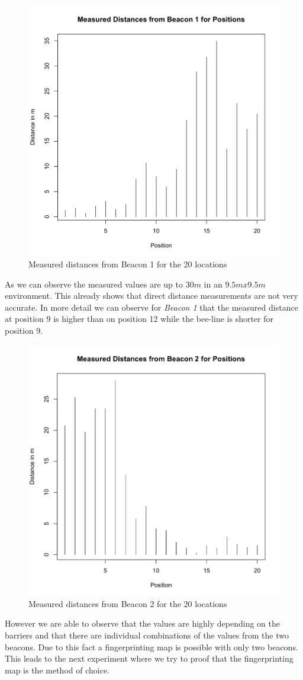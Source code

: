 \begin{figure}[h]
	\centering
		\includegraphics[width=.5\textwidth]{images/distaceBea1.png}
	\caption{Measured distances from Beacon 1 for the 20 locations}
	\label{fig:distaceBea1}
\end{figure}


As we can observe the measured values are up to $30m$ in an $9.5mx9.5m$ environment. This already shows that direct distance measurements are not very accurate. In more detail we can observe for \textit{Beacon 1} that the measured distance at position 9 is higher than on position 12 while the bee-line is shorter for position 9. 

\begin{figure}[h]
	\centering
		\includegraphics[width=.5\textwidth]{images/distaceBea2.png}
	\caption{Measured distances from Beacon 2 for the 20 locations}
	\label{fig:distaceBea2}
\end{figure}

However we are able to observe that the values are highly depending on the barriers and that there are individual combinations of the values from the two beacons. Due to this fact a fingerprinting map is possible with only two beacons. This leads to the next experiment where we try to proof that the fingerprinting map is the method of choice. 


